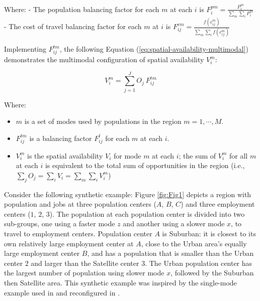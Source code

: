 \documentclass[numbered]{trbunofficial}
\providecommand{\tightlist}{%
  \setlength{\itemsep}{0pt}\setlength{\parskip}{0pt}}
\begin{document}
\noindent Where: - The population balancing factor for each \(m\) at
each \(i\) is \(F^{pm}_{i} = \frac{P_{i}^m}{\sum_{m}\sum_{i} P_{i}^m}\)
- The cost of travel balancing factor for each \(m\) at \(i\) is
\(F_{ij}^{cm} = \frac{f(c_{ij}^m)}{\sum_{m} \sum_{i} f(c_{ij}^m)}\)

Implementing \(F^{tm}_{ij}\), the following Equation
(\ref{eq:spatial-availability-multimodal}) demonstrates the multimodal
configuration of spatial availability \(V_i^m\):

\begin{equation}
\label{eq:spatial-availability-multimodal}
V^m_{i} = \sum_{j=1}^J O_j\ F^{tm}_{ij}
\end{equation}

\noindent Where:

\begin{itemize}
\tightlist
\item
  \(m\) is a set of modes used by populations in the region
  \(m = 1, \cdots, M\).
\item
  \(F^{tm}_{ij}\) is a balancing factor \(F^t_{ij}\) for each \(m\) at
  each \(i\).
\item
  \(V^m_{i}\) is the spatial availability \(V_{i}\) for mode \(m\) at
  each \(i\); the sum of \(V^m_{i}\) for all \(m\) at each \(i\) is
  equivalent to the total sum of opportunities in the region (i.e.,
  \(\sum_j O_j = \sum_i V_i = \sum_{m} \sum_{i} V^m_{i}\))
\end{itemize}

Consider the following synthetic example: Figure \ref{fig:Fig1} depicts
a region with population and jobs at three population centers (\(A\),
\(B\), \(C\)) and three employment centers (\(1\), \(2\), \(3\)). The
population at each population center is divided into two sub-groups, one
using a faster mode \(z\) and another using a slower mode \(x\), to
travel to employment centers. Population center \(A\) is Suburban: it is
closest to its own relatively large employment center at \(A\), close to
the Urban area's equally large employment center \(B\), and has a
population that is smaller than the Urban center \(2\) and larger than
the Satellite center \(3\). The Urban population center has the largest
number of population using slower mode \(x\), followed by the Suburban
then Satellite area. This synthetic example was inspired by the
single-mode example used in
\citet{shenLocationCharacteristicsInnercity1998} and reconfigured in
\citet{soukhovIntroducingSpatialAvailability2023}.
\end{document}
